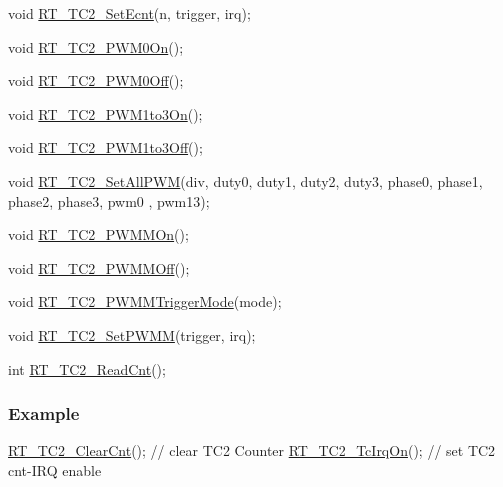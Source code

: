 \begin{DoxyCode}
\textcolor{keywordtype}{void} \mbox{\hyperlink{a00149_af07bf5769df0423324194f22e008e832}{RT\_TC2\_SetEcnt}}(n, trigger, irq);

\textcolor{keywordtype}{void} \mbox{\hyperlink{a00149_abaff3048e72dc0cb912c898a0a4c4e14}{RT\_TC2\_PWM0On}}();

\textcolor{keywordtype}{void} \mbox{\hyperlink{a00149_a52f984fc9f5bc4d1821025ad8d75f3c9}{RT\_TC2\_PWM0Off}}();

\textcolor{keywordtype}{void} \mbox{\hyperlink{a00149_adc090dee2463a2a27b57234e63f0c0b5}{RT\_TC2\_PWM1to3On}}();

\textcolor{keywordtype}{void} \mbox{\hyperlink{a00149_adec1566e2c2a16ab922163a22f3c99df}{RT\_TC2\_PWM1to3Off}}();

\textcolor{keywordtype}{void} \mbox{\hyperlink{a00149_a49e7120e90142442bdd0744f61b572a5}{RT\_TC2\_SetAllPWM}}(div, duty0, duty1, duty2, duty3, phase0, phase1, phase2, phase3, pwm0
      , pwm13);

\textcolor{keywordtype}{void} \mbox{\hyperlink{a00149_a37ffb0b466d2a13bb9917a818b06776b}{RT\_TC2\_PWMMOn}}();

\textcolor{keywordtype}{void} \mbox{\hyperlink{a00149_abe6d0acfd60eb7058f0622de867c5b87}{RT\_TC2\_PWMMOff}}();

\textcolor{keywordtype}{void} \mbox{\hyperlink{a00149_a80f5ade258504a1243ccb058dd860475}{RT\_TC2\_PWMMTriggerMode}}(mode);

\textcolor{keywordtype}{void} \mbox{\hyperlink{a00149_ad3b483689d5dd170a343222a71f43c9f}{RT\_TC2\_SetPWMM}}(trigger, irq);

\textcolor{keywordtype}{int}  \mbox{\hyperlink{a00149_a6591a513f367f6e7be0a90cb72aa3d49}{RT\_TC2\_ReadCnt}}();
\end{DoxyCode}


\subsubsection*{Example}


\begin{DoxyCode}
\mbox{\hyperlink{a00149_ab1818ddcd1db9a3582f3bc37e1d62881}{RT\_TC2\_ClearCnt}}();       \textcolor{comment}{// clear TC2 Counter}
\mbox{\hyperlink{a00149_a0d385385ff809f653b9e7a6d6a111838}{RT\_TC2\_TcIrqOn}}();        \textcolor{comment}{// set TC2 cnt-IRQ enable}
\end{DoxyCode}
 